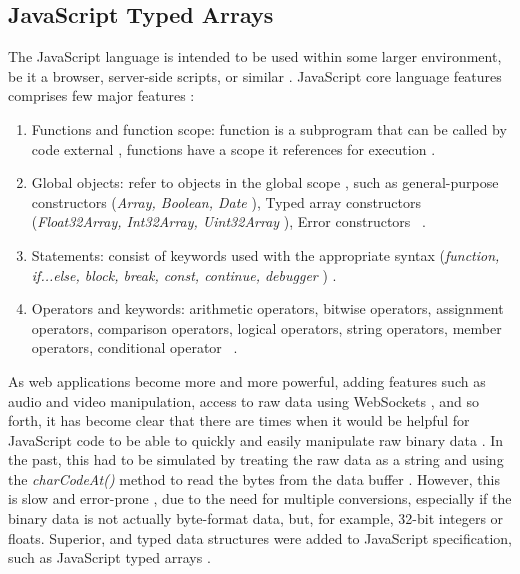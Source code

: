 
\subsection{JavaScript Typed Arrays} %
\label{sub:basic_concepts:web:javascript_typed_arrays}

The JavaScript language \cite{International2009} is intended to be used within some larger environment, be it a browser, server-side scripts, or similar \cite{Grosskurth2005}. JavaScript core language features comprises few major features \cite{MDN2013}:

\begin{enumerate}
\item Functions and function scope: function is a subprogram that can be called by code external \cite{MDN2013}, functions have a scope it references for execution \cite{MDN2013}.
\item Global objects: refer to objects in the global scope \cite{MDN2013}, such as general-purpose constructors (\textit{Array, Boolean, Date} \etc), Typed array constructors (\textit{Float32Array, Int32Array, Uint32Array} \etc), Error constructors \etc\ \cite{MDN2013}.
\item Statements: consist of keywords used with the appropriate syntax (\textit{function, if...else, block, break, const, continue, debugger \etc}) \cite{MDN2013}.
\item Operators and keywords: arithmetic operators, bitwise operators, assignment operators, comparison operators, logical operators, string operators, member operators, conditional operator \etc\ \cite{MDN2013}.
\end{enumerate}

As web applications become more and more powerful, adding features such as audio and video manipulation, access to raw data using WebSockets \cite{MDN2013}, and so forth, it has become clear that there are times when it would be helpful for JavaScript code to be able to quickly and easily manipulate raw binary data \cite{Canvas2013} \cite{TypedArray2013}. In the past, this had to be simulated by treating the raw data as a string and using the \textit{charCodeAt()} method to read the bytes from the data buffer \cite{MDN2013} \cite{TypedArray2013}. However, this is slow and error-prone \cite{MDN2013}, due to the need for multiple conversions, especially if the binary data is not actually byte-format data, but, for example, 32-bit integers or floats. Superior, and typed data structures were added to JavaScript specification, such as JavaScript typed arrays \cite{MDN2013} \cite{International2009}.

